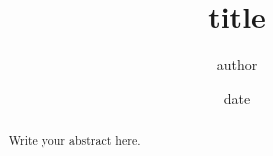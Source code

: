 \documentclass[a4paper,12pt]{article}
\title{{{title}}}
\author{{{author}}}
\date{{{date}}}
\begin{document}
\maketitle

\begin{abstract}
Write your abstract here.
\end{abstract}





\end{document}
